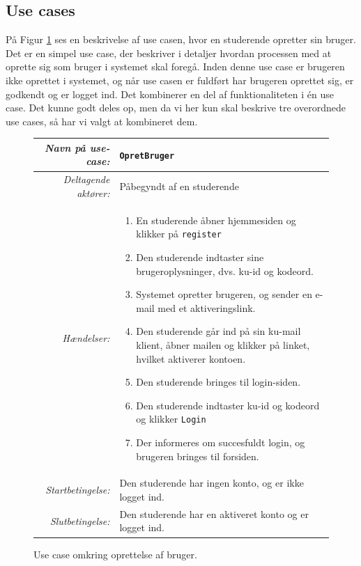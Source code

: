 \documentclass[11pt, a4paper]{article}
\begin{document}
\subsection{Use cases}
\label{sub:use_cases}
På Figur \ref{fig:use_case1} ses en beskrivelse af use casen, hvor en studerende opretter sin bruger. Det er en simpel use case, der beskriver i detaljer hvordan processen med at oprette sig som bruger i systemet skal foregå. Inden denne use case er brugeren ikke oprettet i systemet, og når use casen er fuldført har brugeren oprettet sig, er godkendt og er logget ind. Det kombinerer en del af funktionaliteten i én use case. Det kunne godt deles op, men da vi her kun skal beskrive tre overordnede use cases, så har vi valgt at kombineret dem.

\begin{figure}[h]
    \centering
    \begin{tabular}{r p{8cm}}
        \toprule
        \textit{Navn på use-case:} & \verb!OpretBruger! \\
        \hline
        \textit{Deltagende aktører:} & Påbegyndt af en studerende \\
        \hline
        \textit{Hændelser:} & \begin{enumerate}[nolistsep]
            \item En studerende åbner hjemmesiden og klikker på \verb!register!
            \item Den studerende indtaster sine brugeroplysninger, dvs. ku-id og kodeord.
            \item Systemet opretter brugeren, og sender en e-mail med et aktiveringslink.
            \item Den studerende går ind på sin ku-mail klient, åbner mailen og klikker på linket, hvilket aktiverer kontoen.
            \item Den studerende bringes til login-siden.
            \item Den studerende indtaster ku-id og kodeord og klikker \verb!Login!
            \item Der informeres om succesfuldt login, og brugeren bringes til forsiden.
        \end{enumerate}  \\
        \hline
        \textit{Startbetingelse:} & Den studerende har ingen konto, og er ikke logget ind. \\
        \hline
        \textit{Slutbetingelse:} & Den studerende har en aktiveret konto og er logget ind. \\
        \bottomrule
    \end{tabular}
    \caption{Use case omkring oprettelse af bruger.}
    \label{fig:use_case1}
\end{figure}
\end{document}
